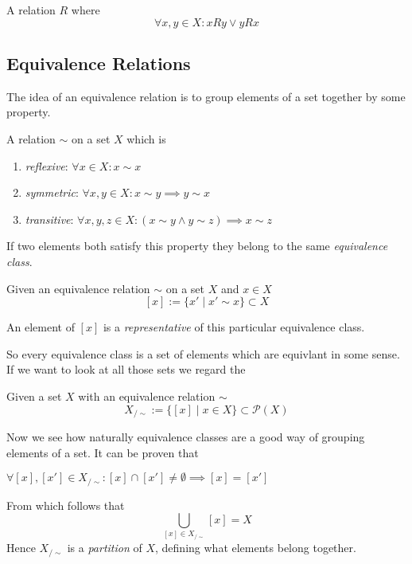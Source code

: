 \begin{definition}
   A relation \(R\) where
   \[\forall x, y \in X: xRy \lor yRx\]
\end{definition}

\subsection{Equivalence Relations}
The idea of an equivalence relation is to group elements of a set together by some property.
\begin{definition}\label{def:equivalence_relation}
   A relation \(\sim\) on a set \(X\) which is
   \begin{enumerate}[label=\roman*, align=Center]
      \item \emph{reflexive}: \(\forall x \in X: x \sim x\)
      \item \emph{symmetric}: \(\forall x, y \in X: x \sim y \implies y \sim x\)
      \item \emph{transitive}: \(\forall x, y, z \in X: (x \sim y \land y \sim z) \implies x \sim z\)
   \end{enumerate}
\end{definition}
If two elements both satisfy this property they belong to the same \emph{equivalence class}.
\begin{definition}
   Given an equivalence relation \(\sim\) on a set \(X\) and \(x \in X\)
   \[[x] := \{x' \mid x' \sim x\} \subset X\]
\end{definition}
\begin{remark}[Terminology]
   An element of \([x]\) is a \emph{representative} of this particular equivalence class.
\end{remark}
So every equivalence class is a set of elements which are equivlant in some sense.
If we want to look at all those sets we regard the
\begin{definition}
   Given a set \(X\) with an equivalence relation \(\sim\)
   \[X_{/\sim} := \big\{[x] \mid x \in X \big\} \subset \mathcal{P}(X)\]
\end{definition}
Now we see how naturally equivalence classes are a good way of grouping elements of a set.
It can be proven that
\begin{theorem}
   \(\forall [x], [x'] \in X_{/\sim}: [x] \cap [x'] \neq \emptyset \implies [x] = [x']\)
\end{theorem}
From which follows that
\[\bigcup_{[x] \in X_{/\sim}} [x] = X\]
Hence \(X_{/\sim}\) is a \emph{partition} of \(X\), defining what elements belong together.
